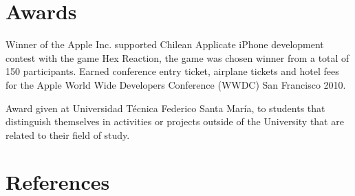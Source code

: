 \documentclass[10pt, a4paper, dvips]{moderncv}
\begin{document}
\section{Awards}
{
\begin{scriptsize}
Winner of the Apple Inc. supported Chilean Applicate iPhone development contest with the game Hex Reaction, the game was chosen winner from a total of 150 participants. Earned conference entry ticket, airplane tickets and hotel fees for the Apple World Wide Developers Conference (WWDC) San Francisco 2010.\\
\end{scriptsize}
}

{
\begin{scriptsize}
Award given at Universidad T\'ecnica Federico Santa Mar\'ia, to students that distinguish themselves in activities or projects outside of the University that are related to their field of study.
\end{scriptsize}
}

\nocite{*}


\section{References}
{
}
\end{document}
